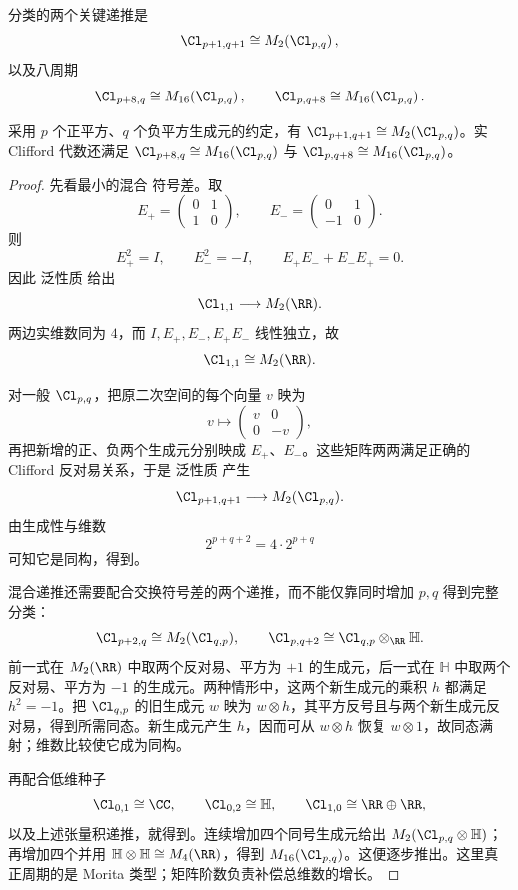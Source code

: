 分类的两个关键递推是
\begin{equation}
\Cl_{p+1,q+1}
\cong M_2\!\left(\Cl_{p,q}\right),
\label{eq:clifford-pq-recursion}
\end{equation}
以及八周期
\begin{equation}
\Cl_{p+8,q}
\cong M_{16}\!\left(\Cl_{p,q}\right),
\qquad
\Cl_{p,q+8}
\cong M_{16}\!\left(\Cl_{p,q}\right).
\label{eq:clifford-bott-eight-periodicity}
\end{equation}

\begin{proposition}
采用 $p$ 个正平方、$q$ 个负平方生成元的约定，有 $\Cl_{p+1,q+1}\cong M_2(\Cl_{p,q})$。实 Clifford 代数还满足 $\Cl_{p+8,q}\cong M_{16}(\Cl_{p,q})$ 与 $\Cl_{p,q+8}\cong M_{16}(\Cl_{p,q})$。
\end{proposition}
\begin{proof}
先看最小的混合 符号差。取
\[
E_+=
\begin{pmatrix}
0&1\\
1&0
\end{pmatrix},
\qquad
E_-=
\begin{pmatrix}
0&1\\
-1&0
\end{pmatrix}.
\]
则
\[
E_+^2=I,
\qquad
E_-^2=-I,
\qquad
E_+E_-+E_-E_+=0.
\]
因此 泛性质 给出
\[
\Cl_{1,1}\longrightarrow M_2(\RR).
\]
两边实维数同为 $4$，而 $I,E_+,E_-,E_+E_-$ 线性独立，故
\[
\Cl_{1,1}\cong M_2(\RR).
\]

对一般 $\Cl_{p,q}$，把原二次空间的每个向量 $v$ 映为
\[
v\longmapsto
\begin{pmatrix}
v&0\\
0&-v
\end{pmatrix},
\]
再把新增的正、负两个生成元分别映成 $E_+$、$E_-$。这些矩阵两两满足正确的 Clifford 反对易关系，于是 泛性质 产生
\[
\Cl_{p+1,q+1}
\longrightarrow M_2(\Cl_{p,q}).
\]
由生成性与维数
\[
2^{p+q+2}=4\cdot2^{p+q}
\]
可知它是同构，得到。

混合递推还需要配合交换符号差的两个递推，而不能仅靠同时增加 $p,q$ 得到完整分类：
\[
\Cl_{p+2,q}\cong M_2(\Cl_{q,p}),\qquad
\Cl_{p,q+2}\cong\Cl_{q,p}\otimes_{\RR}\mathbb H.
\]
前一式在 $M_2(\RR)$ 中取两个反对易、平方为 $+1$ 的生成元，后一式在 $\mathbb H$ 中取两个反对易、平方为 $-1$ 的生成元。两种情形中，这两个新生成元的乘积 $h$ 都满足 $h^2=-1$。把 $\Cl_{q,p}$ 的旧生成元 $w$ 映为 $w\otimes h$，其平方反号且与两个新生成元反对易，得到所需同态。新生成元产生 $h$，因而可从 $w\otimes h$ 恢复 $w\otimes1$，故同态满射；维数比较使它成为同构。

再配合低维种子
\[
\Cl_{0,1}\cong\CC,
\qquad
\Cl_{0,2}\cong\mathbb H,
\qquad
\Cl_{1,0}\cong\RR\oplus\RR,
\]
以及上述张量积递推，就得到。连续增加四个同号生成元给出 $M_2(\Cl_{p,q}\otimes\mathbb H)$；再增加四个并用 $\mathbb H\otimes\mathbb H\cong M_4(\RR)$，得到 $M_{16}(\Cl_{p,q})$。这便逐步推出。这里真正周期的是 Morita 类型；矩阵阶数负责补偿总维数的增长。
\end{proof}

